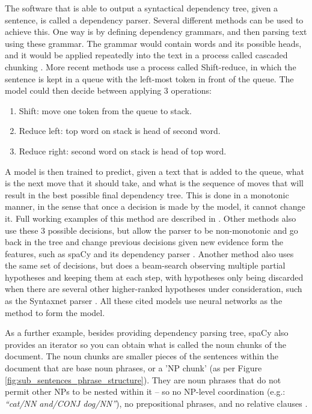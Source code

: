 \documentclass[11pt,a4paper,openright]{memoir}
\begin{document}
The software that is able to output a syntactical dependency tree, given a sentence, is called a dependency parser. Several different methods can be used to achieve this. One way is by defining dependency grammars, and then parsing text using these grammar. The grammar would contain words and its possible heads, and it would be applied repeatedly into the text in a process called cascaded chunking \cite{BirdKleinLoper09}. More recent methods use a process called Shift-reduce, in which the sentence is kept in a queue with the left-most token in front of the queue. The model could then decide between applying 3 operations:
\begin{enumerate}
  \item Shift: move one token from the queue to stack.
  \item Reduce left: top word on stack is head of second word.
  \item Reduce right: second word on stack is head of top word.
\end{enumerate}

A model is then trained to predict, given a text that is added to the queue, what is the next move that it should take, and what is the sequence of moves that will result in the best possible final dependency tree. This is done in a monotonic manner, in the sense that once a decision is made by the model, it cannot change it. Full working examples of this method are described in \cite{chen-manning:2014:EMNLP2014}. Other methods also use these 3 possible decisions, but allow the parser to be non-monotonic and go back in the tree and change previous decisions given new evidence form the features, such as spaCy and its dependency parser \cite{honnibal-johnson:2015:EMNLP, spacy}. Another method also uses the same set of decisions, but does a beam-search observing multiple partial hypotheses and keeping them at each step, with hypotheses only being discarded when there are several other higher-ranked hypotheses under consideration, such as the Syntaxnet parser \cite{google-syntaxnet, DBLP:journals/corr/AndorAWSPGPC16}. All these cited models use neural networks as the method to form the model.

As a further example, besides providing dependency parsing tree, spaCy also provides an iterator so you can obtain what is called the noun chunks of the document. The noun chunks are smaller pieces of the sentences within the document that are base noun phrases, or a 'NP chunk' (as per Figure \ref{fig:sub_sentences_phrase_structure}). They are noun phrases that do not permit other NPs to be nested within it – so no NP-level coordination (e.g.: \emph{\enquote{cat/NN and/CONJ dog/NN}}), no prepositional phrases, and no relative clauses \cite{spacy}.
\end{document}
